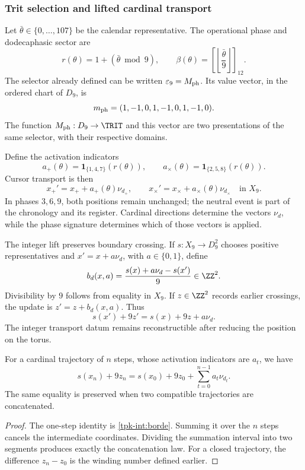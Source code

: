 \subsubsection{Trit selection and lifted cardinal transport}
\label{tpk-int:seleccion}

Let \(\bar\theta\in\{0,\ldots,107\}\) be the calendar representative.
The operational phase and dodecaphasic sector are
\begin{equation}
 r(\theta)=1+(\bar\theta\bmod9),\qquad
 \beta(\theta)=\left[\left\lfloor\frac{\bar\theta}{9}\right\rfloor\right]_{12}.
 \label{tpk-int:fase}
\end{equation}
The selector already defined can be written \(\varepsilon_9=M_{\rm ph}\).
Its value vector, in the ordered chart of \(D_9\), is
\[
 m_{\rm ph}=(1,-1,0,1,-1,0,1,-1,0).
\]
The function \(M_{\rm ph}:D_9\to\TRIT\) and this vector are two
presentations of the same selector, with their respective domains.

Define the activation indicators
\[
 a_+(\theta)=\mathbf1_{\{1,4,7\}}(r(\theta)),\qquad
 a_\times(\theta)=\mathbf1_{\{2,5,8\}}(r(\theta)).
\]
Cursor transport is then
\begin{equation}
 x_+'=x_++a_+(\theta)\nu_{d_+},\qquad
 x_\times'=x_\times+a_\times(\theta)\nu_{d_\times}
 \quad\text{in }X_9.
 \label{tpk-int:cursores}
\end{equation}
In phases \(3,6,9\), both positions remain unchanged; the neutral event
is part of the chronology and its register. Cardinal directions
determine the vectors \(\nu_d\), while the phase signature determines
which of those vectors is applied.

The integer lift preserves boundary crossing. If
\(s:X_9\to D_9^2\) chooses positive representatives and
\(x'=x+a\nu_d\), with \(a\in\{0,1\}\), define
\begin{equation}
 b_d(x,a)=\frac{s(x)+a\nu_d-s(x')}{9}\in\ZZ^2.
 \label{tpk-int:borde}
\end{equation}
Divisibility by \(9\) follows from equality in \(X_9\).
If \(z\in\ZZ^2\) records earlier crossings, the update is
\(z'=z+b_d(x,a)\). Thus
\[
 s(x')+9z'=s(x)+9z+a\nu_d.
\]
The integer transport datum remains reconstructible after reducing
the position on the torus.

\begin{proposition}
\label{tpk-int:prop-desplazamiento}
For a cardinal trajectory of \(n\) steps, whose activation
indicators are \(a_t\), we have
\[
 s(x_n)+9z_n=s(x_0)+9z_0+
 \sum_{t=0}^{n-1}a_t\nu_{d_t}.
\]
The same equality is preserved when two compatible trajectories are concatenated.
\end{proposition}
\begin{proof}
The one-step identity is \eqref{tpk-int:borde}. Summing it over the
\(n\) steps cancels the intermediate coordinates. Dividing the summation
interval into two segments produces exactly the concatenation law. For a
closed trajectory, the difference \(z_n-z_0\) is the winding
number defined earlier.
\end{proof}

